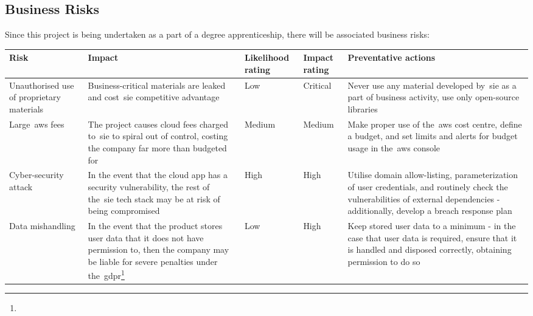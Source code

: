 \begin{tabularx}{\textwidth}{szssz}
\end{tabularx}

\subsection{Business Risks}\label{subsec:business-risks}
Since this project is being undertaken as a part of a degree apprenticeship, there will be associated business risks:

\begin{tabularx}{\textwidth}{szssz}
    \caption{Business Risks}\label{tab:business-risks}\\
    \hline
    \textbf{Risk} & \textbf{Impact} & \textbf{Likelihood rating} & \textbf{Impact rating} & \textbf{Preventative actions} \\\hline
    Unauthorised use of proprietary materials & Business-critical materials are leaked and cost~\gls{sie} competitive advantage & Low & Critical & Never use any material developed by~\gls{sie} as a part of business activity, use only open-source libraries\\\hline
    Large~\gls{aws} fees & The project causes cloud fees charged to~\gls{sie} to spiral out of control, costing the company far more than budgeted for & Medium & Medium & Make proper use of the~\gls{aws} cost centre, define a budget, and set limits and alerts for budget usage in the~\gls{aws} console \\\hline
    Cyber-security attack & In the event that the cloud app has a security vulnerability, the rest of the~\gls{sie} tech stack may be at risk of being compromised & High & High & Utilise domain allow-listing, parameterization of user credentials, and routinely check the vulnerabilities of external dependencies - additionally, develop a breach response plan \\\hline
    Data mishandling & In the event that the product stores user data that it does not have permission to, then the company may be liable for severe penalties under the~\gls{gdpr}\footnote{} & Low & High & Keep stored user data to a minimum - in the case that user data is required, ensure that it is handled and disposed correctly, obtaining permission to do so

\end{tabularx}

